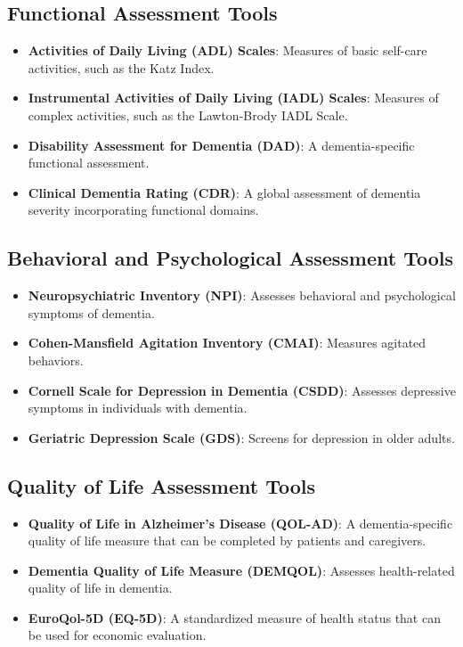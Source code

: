 \subsection{Functional Assessment Tools}
\begin{itemize}
    \item \textbf{Activities of Daily Living (ADL) Scales}: Measures of basic self-care activities, such as the Katz Index.
    
    \item \textbf{Instrumental Activities of Daily Living (IADL) Scales}: Measures of complex activities, such as the Lawton-Brody IADL Scale.
    
    \item \textbf{Disability Assessment for Dementia (DAD)}: A dementia-specific functional assessment.
    
    \item \textbf{Clinical Dementia Rating (CDR)}: A global assessment of dementia severity incorporating functional domains.
\end{itemize}

\subsection{Behavioral and Psychological Assessment Tools}
\begin{itemize}
    \item \textbf{Neuropsychiatric Inventory (NPI)}: Assesses behavioral and psychological symptoms of dementia.
    
    \item \textbf{Cohen-Mansfield Agitation Inventory (CMAI)}: Measures agitated behaviors.
    
    \item \textbf{Cornell Scale for Depression in Dementia (CSDD)}: Assesses depressive symptoms in individuals with dementia.
    
    \item \textbf{Geriatric Depression Scale (GDS)}: Screens for depression in older adults.
\end{itemize}

\subsection{Quality of Life Assessment Tools}
\begin{itemize}
    \item \textbf{Quality of Life in Alzheimer's Disease (QOL-AD)}: A dementia-specific quality of life measure that can be completed by patients and caregivers.
    
    \item \textbf{Dementia Quality of Life Measure (DEMQOL)}: Assesses health-related quality of life in dementia.
    
    \item \textbf{EuroQol-5D (EQ-5D)}: A standardized measure of health status that can be used for economic evaluation.
\end{itemize}

